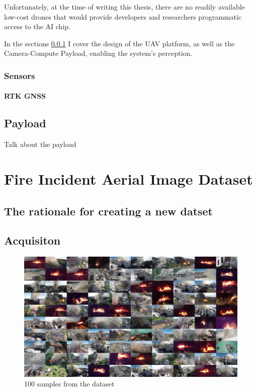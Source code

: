   Unfortunately, at the time of writing this thesis, there are no readily available low-cost drones that would provide developers and researchers
  programmatic access to the AI chip. 
  
  In the sections \ref{sec:sensors} I cover the design of the UAV platform, as well as the Camera-Compute Payload, enabling the system's perception.

  \subsubsection{Sensors}\label{sec:sensors}


  \paragraph{RTK GNSS}


  \subsection{Payload}
  Talk about the payload 


\section{Fire Incident Aerial Image Dataset}\label{sec:dataset}

  \subsection{The rationale for creating a new datset}

  \subsection{Acquisiton}
  \begin{figure}
    \centering
    \includegraphics[width=\linewidth]{figures/lowres_100tiles.jpg}
    \caption{100 samples from the dataset}
  \end{figure}

